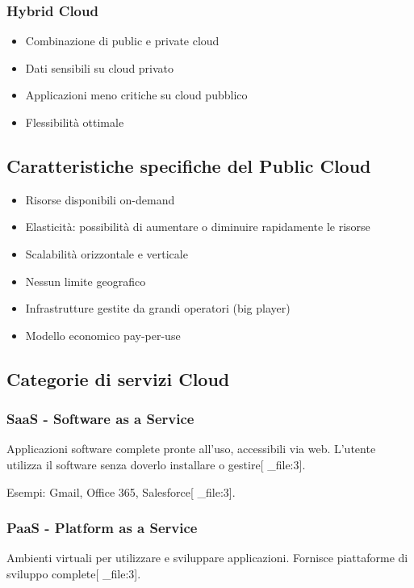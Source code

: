 \documentclass[12pt,a4paper]{article}
\begin{document}
\subsubsection{Hybrid Cloud}
\begin{itemize}
    \item Combinazione di public e private cloud
    \item Dati sensibili su cloud privato
    \item Applicazioni meno critiche su cloud pubblico
    \item Flessibilità ottimale
\end{itemize}

\subsection{Caratteristiche specifiche del Public Cloud}
\begin{itemize}
    \item Risorse disponibili on-demand
    \item Elasticità: possibilità di aumentare o diminuire rapidamente le risorse
    \item Scalabilità orizzontale e verticale
    \item Nessun limite geografico
    \item Infrastrutture gestite da grandi operatori (big player)
    \item Modello economico pay-per-use
\end{itemize}

\subsection{Categorie di servizi Cloud}

\subsubsection{SaaS - Software as a Service}
Applicazioni software complete pronte all'uso, accessibili via web. L'utente utilizza il software senza doverlo installare o gestire[ _file:3].

Esempi: Gmail, Office 365, Salesforce[ _file:3].

\subsubsection{PaaS - Platform as a Service}
Ambienti virtuali per utilizzare e sviluppare applicazioni. Fornisce piattaforme di sviluppo complete[ _file:3].
\end{document}
